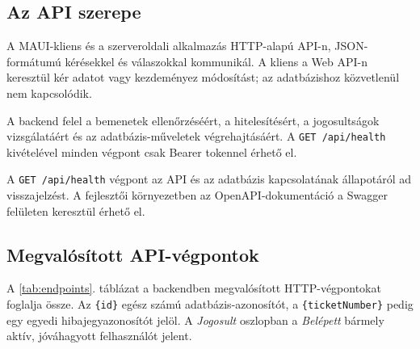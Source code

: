 \documentclass[12pt, a4paper, twoside]{article}
\begin{document}
\subsection{Az API szerepe}

A MAUI-kliens és a szerveroldali alkalmazás HTTP-alapú API-n, JSON-formátumú kérésekkel és válaszokkal kommunikál. A kliens a Web API-n keresztül kér adatot vagy kezdeményez módosítást; az adatbázishoz közvetlenül nem kapcsolódik.

A backend felel a bemenetek ellenőrzéséért, a hitelesítésért, a jogosultságok vizsgálatáért és az adatbázis-műveletek végrehajtásáért. A \texttt{GET /api/health} kivételével minden végpont csak Bearer tokennel érhető el.

A \texttt{GET /api/health} végpont az API és az adatbázis kapcsolatának állapotáról ad visszajelzést. A fejlesztői környezetben az OpenAPI-dokumentáció a Swagger felületen keresztül érhető el.

\subsection{Megvalósított API-végpontok}

A \ref{tab:endpoints}. táblázat a backendben megvalósított HTTP-végpontokat foglalja össze. Az \texttt{\{id\}} egész számú adatbázis-azonosítót, a \texttt{\{ticketNumber\}} pedig egy egyedi hibajegyazonosítót jelöl. A \textit{Jogosult} oszlopban a \textit{Belépett} bármely aktív, jóváhagyott felhasználót jelent.
\end{document}
